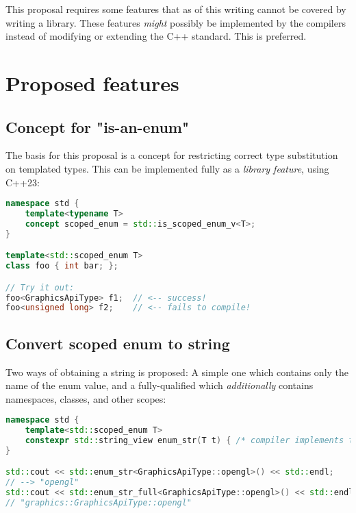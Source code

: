 \documentclass[
  format=manuscript,
  screen=true,
  review=false,
  nonacm=true,
  timestamp=true,
  balance=false]{acmart}
\begin{document}
This proposal requires some features that as of this writing cannot be covered by
writing a library. These features \textit{might} possibly be implemented by the
compilers instead of modifying or extending the C++ standard. This is preferred.


\section{Proposed features}

\subsection{Concept for "is-an-enum"}

The basis for this proposal is a concept for restricting correct type substitution
on templated types. This can be implemented fully as a \textit{library feature},
using C++23:\vspace{2mm}

\begin{lstlisting}[language=Cpp]
namespace std {
    template<typename T>
    concept scoped_enum = std::is_scoped_enum_v<T>;
}

template<std::scoped_enum T>
class foo { int bar; };

// Try it out:
foo<GraphicsApiType> f1;  // <-- success!
foo<unsigned long> f2;    // <-- fails to compile!
\end{lstlisting}


\subsection{Convert scoped enum to string}

Two ways of obtaining a string is proposed: A simple one which contains only the
name of the enum value, and a fully-qualified which \textit{additionally} contains
namespaces, classes, and other scopes:\vspace{2mm}

\begin{lstlisting}[language=Cpp]
namespace std {
    template<std::scoped_enum T>
    constexpr std::string_view enum_str(T t) { /* compiler implements this */ }
}

std::cout << std::enum_str<GraphicsApiType::opengl>() << std::endl;
// --> "opengl"
std::cout << std::enum_str_full<GraphicsApiType::opengl>() << std::endl;
// "graphics::GraphicsApiType::opengl"
\end{lstlisting}
\end{document}
